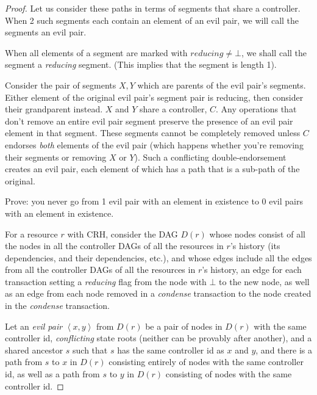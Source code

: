 \documentclass[a4paper,USenglish,cleveref, autoref, thm-restate, anonymous]{lipics-v2021}
\newcommand{\p}[1]{{\ensuremath{\left({{#1}}\right)}}}
\newcommand{\an}[1]{{\left\langle{{#1}}\right\rangle}}
\begin{document}
\begin{proof}
Let us consider these paths in terms of segments that share a controller. 
When 2 such segments each contain an element of an evil pair, we will call the segments an evil pair. 

When all elements of a segment are marked with $reducing\ne\bot$, we shall call the segment a \emph{reducing} segment. 
(This implies that the segment is length 1). 

Consider the pair of segments $X,Y$ which are parents of the evil pair's segments. 
Either element of the original evil pair's segment pair is reducing, then consider their grandparent instead. 
$X$ and $Y$ share a controller, $C$. 
Any operations that don't remove an entire evil pair segment preserve the presence of an evil pair element in that segment.
These segments cannot be completely removed unless $C$ endorses \emph{both} elements of the evil pair (which happens whether you're removing their segments or removing $X$ or $Y$).
Such a conflicting double-endorsement creates an evil pair, each element of which has a path that is a sub-path of the original.









Prove: you never go from 1 evil pair with an element in existence to 0 evil pairs with an element in existence. 





For a resource $r$ with CRH, consider the DAG $D\p r$ whose nodes consist of all the nodes in all the controller DAGs of all the resources in $r$'s history (its dependencies, and their dependencies, etc.), and whose edges include all the edges from all the controller DAGs of all the resources in $r$'s history, an edge for each transaction setting a \emph{reducing} flag from the node with $\bot$ to the new node,  as well as an edge from each node removed in a \emph{condense} transaction to the node created in the \emph{condense} transaction. 

Let an \emph{evil pair} $\an{x,y}$ from $D\p r$ be a pair of nodes in $D\p r$ with the same controller id, \emph{conflicting} state roots (neither can be provably after another), and a shared ancestor $s$ such that $s$ has the same controller id as $x$ and $y$, and there is a path from $s$ to $x$ in $D\p r$ consisting entirely of nodes with the same controller id, as well as a path from $s$ to $y$ in $D\p r$ consisting of nodes with the same controller id. 


\end{proof}
\end{document}
